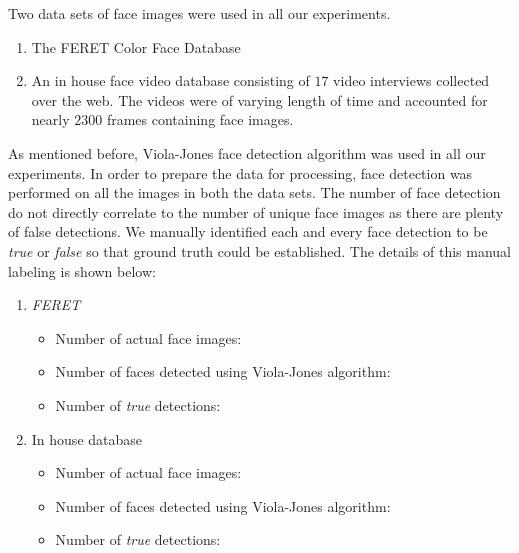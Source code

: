 \documentclass[times, 10pt,twocolumn]{article}
\begin{document}
\label{Experiments} Two data sets of face
images were used in all our experiments.
\begin{enumerate}
\item The FERET Color Face Database
\item An in house face video database consisting of $17$ video
interviews collected over the web. The videos were of varying length
of time and accounted for nearly $2300$ frames containing face
images.
\end{enumerate}
As mentioned before, Viola-Jones face detection algorithm was used
in all our experiments. In order to prepare the data for processing,
face detection was performed on all the images in both the data
sets. The number of face detection do not directly correlate to the
number of unique face images as there are plenty of false
detections. We manually identified each and every face detection to
be {\it true} or {\it false} so that ground truth could be
established. The details of this manual labeling is shown below:
\begin{enumerate}
\item {\em FERET}
\begin{itemize}
\item Number of actual face images:
\item Number of faces detected using Viola-Jones algorithm:
\item Number of {\it true} detections:
\end{itemize}
\item {In house database}
\begin{itemize}
\item Number of actual face images:
\item Number of faces detected using Viola-Jones algorithm:
\item Number of {\it true} detections:
\end{itemize}
\end{enumerate}






\nocite{ex1,ex2}


\end{document}
